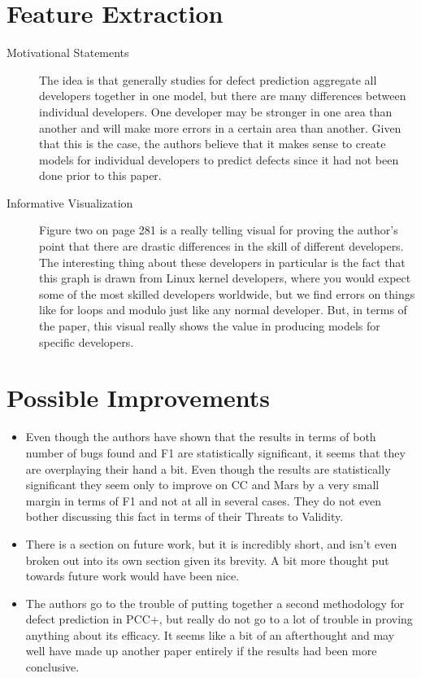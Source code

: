 \documentclass[english]{article}
\begin{document}
\section*{Feature Extraction}
\begin{description}
\item[{Motivational Statements}]  The idea is that generally studies for defect prediction aggregate all developers together in one model, but there are many differences between individual developers.  One developer may be stronger in one area than another and will make more errors in a certain area than another.  Given that this is the case, the authors believe that it makes sense to create models for individual developers to predict defects since it had not been done prior to this paper.
\item[{Informative Visualization}]  Figure two on page 281 is a really telling visual for proving the author's point that there are drastic differences in the skill of different developers.  The interesting thing about these developers in particular is the fact that this graph is drawn from Linux kernel developers, where you would expect some of the most skilled developers worldwide, but we find errors on things like for loops and modulo just like any normal developer.  But, in terms of the paper, this visual really shows the value in producing models for specific developers.

\end{description}


\section*{Possible Improvements}
\begin{itemize}
\item Even though the authors have shown that the results in terms of both number of bugs found and F1 are statistically significant, it seems that they are overplaying their hand a bit.  Even though the results are statistically significant they seem only to improve on CC and Mars by a very small margin in terms of F1 and not at all in several cases.  They do not even bother discussing this fact in terms of their Threats to Validity.
\item There is a section on future work, but it is incredibly short, and isn't even broken out into its own section given its brevity.  A bit more thought put towards future work would have been nice.
\item The authors go to the trouble of putting together a second methodology for defect prediction in PCC+, but really do not go to a lot of trouble in proving anything about its efficacy.  It seems like a bit of an afterthought and may well have made up another paper entirely if the results had been more conclusive. 
\end{itemize}
\end{document}
